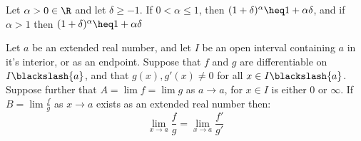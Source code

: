 \begin{theorem}\label{4.3.3}
   Let $\alpha>0 \in \R$ and let  $\delta \geq -1$. If  $0<\alpha \leq 1$, then 
   $(1+\delta)^{\alpha} \heq 1+\alpha\delta$, and if  $\alpha >1$ then $(1+\delta)^{\alpha} \heq 1+\alpha\delta$
\end{theorem}

\begin{theorem}\label{4.3.4}
    Let $a$ be an extended real number, and let  $I$ be an open interval containing  $a$
    in it's interior, or as an endpoint. Suppose that  $f$ and  $g$ are differentiable on  
    $I \blackslash \{a\}$, and that  $g(x), g'(x) \neq 0$ for all  $x \in I \blackslash \{a\}$. 
    Suppose further that  $A=\lim{f}=\lim{g}$ as  $a \rightarrow a$, for  $x \in I$ is either $0$ 
    or  $\infty$. If  $B=\lim{\frac{f}{g}}$ as $x \rightarrow a$ exists as an extended real number
    then:
        \begin{equation}
            \lim_{x \rightarrow a}{\frac{f}{g}}=\lim_{x \rightarrow a}{\frac{f'}{g'}}		
        \end{equation} 
\end{theorem}
